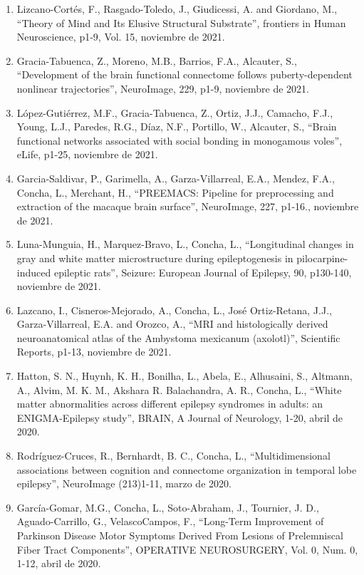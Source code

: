 \begin{enumerate}
\item Lizcano-Cortés, F., Rasgado-Toledo, J., Giudicessi, A. and Giordano, M., “Theory of Mind and Its Elusive Structural 
Substrate”, frontiers in Human Neuroscience, p1-9, Vol. 15,    noviembre de 2021.

\item Gracia-Tabuenca, Z., Moreno, M.B., Barrios, F.A., Alcauter, S., “Development of the brain functional connectome follows 
puberty-dependent nonlinear trajectories”, NeuroImage, 229, p1-9,    noviembre de 2021.

\item López-Gutiérrez, M.F., Gracia-Tabuenca, Z., Ortiz, J.J., Camacho, F.J., Young, L.J., Paredes, R.G., Díaz, N.F., 
Portillo, 
W., Alcauter, S., “Brain functional networks associated with social bonding in monogamous voles”, eLife, p1-25, noviembre de 2021.

\item Garcia-Saldivar, P., Garimella, A., Garza-Villarreal, E.A., Mendez, F.A., Concha, L., Merchant, H., “PREEMACS: Pipeline 
for preprocessing and extraction of the macaque brain surface”, NeuroImage, 227, p1-16.,    
noviembre de 2021.

\item Luna-Munguia, H., Marquez-Bravo, L., Concha, L., “Longitudinal changes in gray and white matter microstructure during 
epileptogenesis in pilocarpine-induced epileptic rats”, Seizure: European Journal of Epilepsy, 90, p130-140, noviembre de 2021.

\item Lazcano, I., Cisneros-Mejorado, A., Concha, L., José Ortiz-Retana, J.J., Garza-Villarreal, E.A. and Orozco, A., “MRI 
and 
histologically derived neuroanatomical atlas of the Ambystoma mexicanum (axolotl)”, Scientific Reports, p1-13, noviembre de 2021.

\item Hatton, S. N., Huynh, K. H., Bonilha, L., Abela, E., Alhusaini, S., Altmann, A., Alvim, M. K. M., Akshara R. 
Balachandra, 
A. R., Concha, L., “White matter abnormalities across different epilepsy syndromes in adults: an ENIGMA-Epilepsy study”, 
BRAIN, A Journal of Neurology, 1-20,    abril de 2020.

\item Rodríguez-Cruces, R., Bernhardt, B. C., Concha, L., “Multidimensional associations between cognition and connectome 
organization in temporal lobe epilepsy”, NeuroImage (213)1-11,    marzo de 2020.

\item García-Gomar, M.G., Concha, L., Soto-Abraham, J., Tournier, J. D., Aguado-Carrillo, G., VelascoCampos, F., “Long-Term 
Improvement of Parkinson Disease Motor Symptoms Derived From Lesions of Prelemniscal Fiber Tract Components”, OPERATIVE 
NEUROSURGERY, Vol. 0, Num. 0, 1-12,    abril de 2020.


\end{enumerate}

